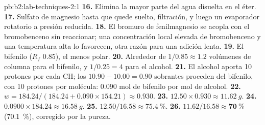 \begin{solution}{pb:b2:lab-techniques-2:1}
\textbf{16.} Elimina la mayor parte del agua disuelta en el éter.
\textbf{17.} Sulfato de magnesio hasta que quede suelto, filtración, y luego un evaporador rotatorio a presión
reducida.
\textbf{18.} El bromuro de fenilmagnesio se acopla con el bromobenceno sin reaccionar; una concentración local elevada de
bromobenceno y una temperatura alta lo favorecen, otra razón para una adición lenta.
\textbf{19.} El bifenilo ($R_f$ 0.85), el menos polar.
\textbf{20.} Alrededor de $1/0.85 \approx 1.2$ volúmenes de columna para el bifenilo, y $1/0.25 = 4$ para el alcohol.
\textbf{21.} El alcohol aporta 10 protones  por cada CH; los $10.90 - 10.00 = 0.90$ sobrantes proceden del
bifenilo, con 10 protones por molécula: 0.090 mol de bifenilo por mol de alcohol.
\textbf{22.} $w = 184.24/(184.24 + 0.090 \times 154.21) \approx 0.930$.
\textbf{23.} $12.50 \times 0.930 \approx \qty{11.62}{g}$.
\textbf{24.} $0.0900 \times 184.24 \approx \qty{16.58}{g}$.
\textbf{25.} $12.50/16.58 \approx 75.4~\%$.
\textbf{26.} $11.62/16.58 \approx \boldsymbol{70~\%}$ (70.1~\%), corregido por la pureza.
\end{solution}
